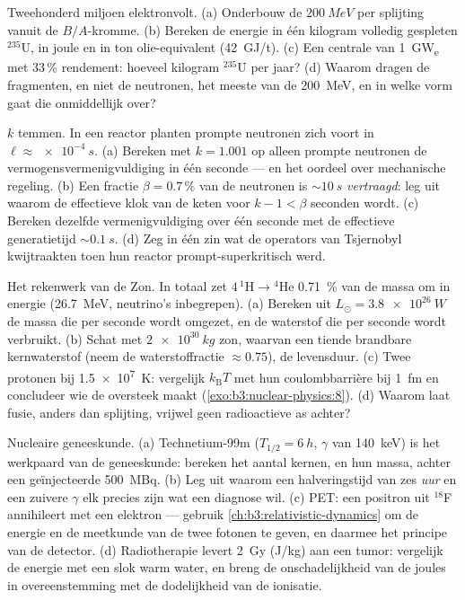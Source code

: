 \begin{exercise}[$\star\star$]\label{exo:b3:nuclear-physics:9}
Tweehonderd miljoen elektronvolt. (a) Onderbouw de
$\qty{200}{MeV}$ per splijting vanuit de $B/A$-kromme. (b) Bereken
de energie in één kilogram volledig gespleten $^{235}$U, in
joule en in ton olie-equivalent
(\qty{42}{GJ/t}). (c) Een centrale van \qty{1}{GW_e} met 33\,\%
rendement: hoeveel kilogram $^{235}$U per jaar? (d) Waarom dragen
de fragmenten, en niet de neutronen, het meeste van de
\qty{200}{MeV}, en in welke vorm gaat die onmiddellijk over?
\end{exercise}

\begin{exercise}[$\star\star\star$]\label{exo:b3:nuclear-physics:10}
$k$ temmen. In een reactor planten prompte neutronen zich voort in $\ell
\approx \qty{e-4}{s}$. (a) Bereken met $k = 1.001$ op alleen prompte
neutronen de vermogensvermenigvuldiging in één seconde --- en het
oordeel over mechanische regeling. (b) Een fractie $\beta =
0.7\,\%$ van de neutronen is $\sim\qty{10}{s}$ \emph{vertraagd}:
leg uit waarom de effectieve klok van de keten voor $k - 1 < \beta$
seconden wordt. (c) Bereken dezelfde vermenigvuldiging over één seconde
met de effectieve generatietijd $\sim\qty{0.1}{s}$. (d) Zeg
in één zin wat de operators van Tsjernobyl kwijtraakten toen hun
reactor prompt-superkritisch werd.
\end{exercise}

\begin{exercise}[$\star\star\star$]\label{exo:b3:nuclear-physics:11}
Het rekenwerk van de Zon. In totaal zet $4\,^1\text{H} \to {}^4\text{He}$
\qty{0.71}{\percent} van de massa om in energie
(\qty{26.7}{MeV}, neutrino's inbegrepen). (a) Bereken uit $L_\odot =
\qty{3.8e26}{W}$ de massa die per seconde wordt omgezet, en de
waterstof die per seconde wordt verbruikt. (b) Schat met $\qty{2e30}{kg}$ zon,
waarvan een tiende brandbare kernwaterstof (neem de waterstoffractie
$\approx0.75$), de levensduur. (c) Twee protonen bij
\qty{1.5e7}{K}: vergelijk $k_{\text{B}}T$ met hun coulombbarrière
bij \qty{1}{fm} en concludeer wie de oversteek maakt
(\cref{exo:b3:nuclear-physics:8}). (d) Waarom laat fusie, anders dan
splijting, vrijwel geen radioactieve as achter?
\end{exercise}

\begin{exercise}[$\star\star\star$]\label{exo:b3:nuclear-physics:12}
Nucleaire geneeskunde. (a) Technetium-99m ($T_{1/2} = \qty{6}{h}$,
$\gamma$ van \qty{140}{keV}) is het werkpaard van de geneeskunde: bereken het
aantal kernen, en hun massa, achter een geïnjecteerde
\qty{500}{MBq}. (b) Leg uit waarom een halveringstijd van zes \emph{uur} en een
zuivere $\gamma$ elk precies zijn wat een diagnose wil. (c) PET:
een positron uit $^{18}$F annihileert met een elektron ---
gebruik \cref{ch:b3:relativistic-dynamics} om de energie en de
meetkunde van de twee fotonen te geven, en daarmee het principe van de detector.
(d) Radiotherapie levert \qty{2}{Gy} (\unit{J/kg}) aan een tumor:
vergelijk de energie met een slok warm water, en breng de
onschadelijkheid van de joules in overeenstemming met de dodelijkheid van de ionisatie.
\end{exercise}

